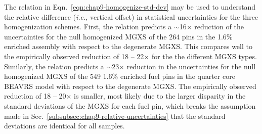 The relation in Eqn.~\ref{eqn:chap9-homogenize-std-dev} may be used to understand the relative difference (\textit{i.e.}, vertical offset) in statistical uncertainties for the three homogenization schemes. First, the relation predicts a $\sim$16$\times$ reduction of the uncertainties for the null homogenized \ac{MGXS} of the 264 pins in the 1.6\% enriched assembly with respect to the degenerate \ac{MGXS}. This compares well to the empirically observed reduction of 18 -- 22$\times$ for the the different \ac{MGXS} types. Similarly, the relation predicts a $\sim$23$\times$ reduction in the uncertainties for the null homogenized \ac{MGXS} of the 549 1.6\% enriched fuel pins in the quarter core \ac{BEAVRS} model with respect to the degenerate \ac{MGXS}. The empirically observed reduction of 18 -- 20$\times$ is smaller, most likely due to the larger disparity in the standard deviations of the \ac{MGXS} for each fuel pin, which breaks the assumption made in Sec.~\ref{subsubsec:chap9-relative-uncertainties} that the standard deviations are identical for all samples.

